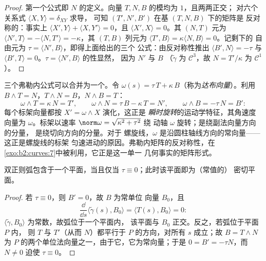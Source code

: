 \begin{proof}
第一个公式即 $N$ 的定义。向量
$T, N, B$ 的模均为 $1$，且两两正交；
对六个关系式 $\langle X, Y\rangle = \delta_{XY}$ 求导，
可知 $(T', N', B')$ 在基 $(T, N, B)$ 下的矩阵是
反对称的：事实上 $\langle X', Y\rangle + \langle X, Y'\rangle = 0$，且
$\langle X', X\rangle = 0$。其 $(N, T)$ 元为 $\langle N', T\rangle =
-\langle N, T'\rangle = -\kappa$，其 $(T, B)$ 列元为
$\langle T', B\rangle = \kappa\langle N, B\rangle = 0$。记剩下的
自由元为 $\tau = \langle N', B\rangle$，即得上面给出的三个
公式：由反对称性推出 $\langle B', N\rangle = -\tau$ 与
$\langle B', T\rangle = 0$。$\tau = \langle N', B\rangle$ 的性显然，
因为 $N'$ 与 $B$ （$\tilde\gamma$ 为
$\mathcal{C}^3$，故 $N = T'/\kappa$ 为 $\mathcal{C}^1$）。
\end{proof}

\begin{example}[达布向量]\label{ex:b2:curves:darboux}
三个弗勒内公式可以合并为一个。令 $\omega(s) =
\tau\,T + \kappa\,B$（称为\emph{达布向量}）。利用 $B
\wedge T = N$，$T \wedge N = B$，$N \wedge B = T$：
\[
\omega \wedge T = \kappa\,N = T', \qquad
\omega \wedge N = \tau\,B - \kappa\,T = N', \qquad
\omega \wedge B = -\tau\,N = B' :
\]
每个标架向量都按 $X' = \omega \wedge X$ 演化，这正是
\emph{瞬时旋转}的运动学特征，其角速度向量为
$\omega$。标架以速率
$\norm\omega = \sqrt{\kappa^2 + \tau^2}$ 绕
动轴 $\omega$ 旋转；是绕副法向量方向的分量，
是绕切向方向的分量。对于
螺旋线，$\omega$ 是沿圆柱轴线方向的常向量——
这正是螺旋线的标架
匀速进动的原因。弗勒内矩阵的反对称性，在
\cref{exo:b2:curves:7}中被利用，它正是这一单一
几何事实的矩阵形式。
\end{example}

\begin{proposition}[挠率刻画平面性]\label{prop:b2:curves:torsion}
双正则弧包含于一个平面，当且仅当 $\tau
\equiv 0$；此时该平面即为（常值的）
密切平面。
\end{proposition}

\begin{proof}
若 $\tau \equiv 0$，则 $B' = 0$，故 $B$ 为常单位
向量 $B_0$，且
\[
\frac{\dd}{\dd s}\langle \tilde\gamma(s), B_0\rangle
= \langle T(s), B_0\rangle = 0 :
\]
$\langle \tilde\gamma, B_0\rangle$ 为常数，故弧位于一个平面内，
该平面与 $B_0$ 正交。反之，若弧位于平面 $P$ 内，
则 $T$ 与 $T'$（从而 $N$）都平行于
$P$ 的方向，对所有 $s$ 成立；故 $B = T \wedge N$ 为
$P$ 的两个单位法向量之一，由于它，它为常向量；于是 $0 = B'
= -\tau N$，而 $N \neq 0$ 迫使 $\tau \equiv 0$。
\end{proof}

